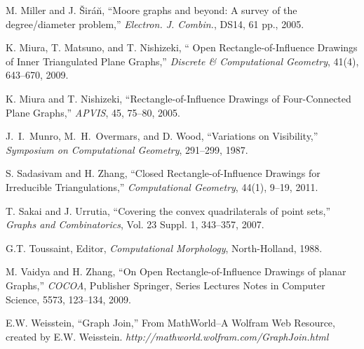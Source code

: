 \documentclass{llncs}
\begin{document}
\begin{thebibliography}{99}
  M. Miller and J. \v{S}ir\'{a}\u{n},
``Moore graphs and beyond: A survey of the degree/diameter problem,''
\emph{Electron. J. Combin.}, DS14, 61 pp., 2005.

 K. Miura, T. Matsuno, and T. Nishizeki, 
`` Open Rectangle-of-Influence Drawings of Inner Triangulated Plane Graphs,''
\emph{Discrete \& Computational Geometry},
41(4), 643--670, 2009.

 K. Miura and T. Nishizeki, 
``Rectangle-of-Influence Drawings of Four-Connected Plane Graphs,''
\emph{APVIS},
45, 75--80, 2005.

 J.~I.~Munro, M.~H.~Overmars, and D. Wood,
``Variations on Visibility,''
\emph{Symposium on Computational Geometry},
291--299, 1987.

 S. Sadasivam and H. Zhang,
``Closed Rectangle-of-Influence Drawings for Irreducible Triangulations,''
\emph{Computational Geometry},
44(1), 9--19, 2011.

  T. Sakai and J. Urrutia, ``Covering the convex
  quadrilaterals of point sets,''
\emph{Graphs and Combinatorics}, Vol. 23 Suppl. 1, 343--357, 2007.

 G.T. Toussaint, Editor,
\emph{Computational Morphology},
North-Holland, 1988.

 M. Vaidya and H. Zhang,
``On Open Rectangle-of-Influence Drawings of planar Graphs,''
\emph{COCOA}, Publisher Springer, Series Lectures Notes in Computer Science,
5573, 123--134, 2009.

 E.W. Weisstein, ``Graph Join,'' From
  MathWorld--A Wolfram Web
  Resource, created by E.W. Weisstein. \textsl{http://mathworld.wolfram.com/GraphJoin.html}
  



\end{thebibliography}
\end{document}
